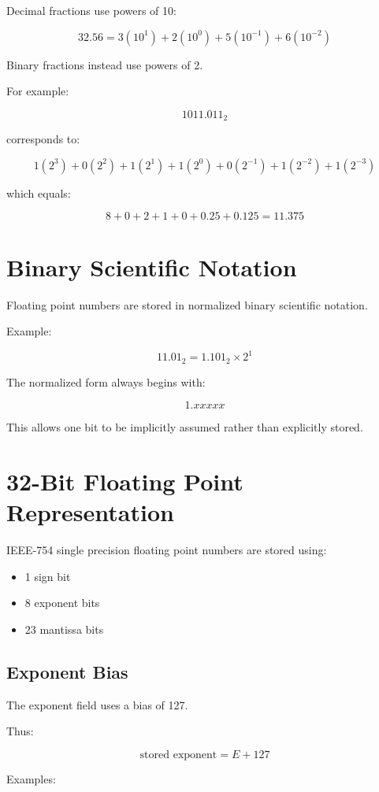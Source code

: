 \documentclass[11pt]{article}
\begin{document}
Decimal fractions use powers of 10:

\[
32.56 = 3(10^1) + 2(10^0) + 5(10^{-1}) + 6(10^{-2})
\]

Binary fractions instead use powers of 2.

For example:

\[
1011.011_2
\]

corresponds to:

\[
1(2^3) + 0(2^2) + 1(2^1) + 1(2^0)
+ 0(2^{-1}) + 1(2^{-2}) + 1(2^{-3})
\]

which equals:

\[
8 + 0 + 2 + 1 + 0 + 0.25 + 0.125 = 11.375
\]

\section{Binary Scientific Notation}

Floating point numbers are stored in normalized binary scientific notation.

Example:

\[
11.01_2 = 1.101_2 \times 2^1
\]

The normalized form always begins with:

\[
1.xxxxx
\]

This allows one bit to be implicitly assumed rather than explicitly stored.

\section{32-Bit Floating Point Representation}

IEEE-754 single precision floating point numbers are stored using:

\begin{itemize}
    \item 1 sign bit
    \item 8 exponent bits
    \item 23 mantissa bits
\end{itemize}

\subsection{Exponent Bias}

The exponent field uses a bias of 127.

Thus:

\[
\text{stored exponent} = E + 127
\]

Examples:
\end{document}
